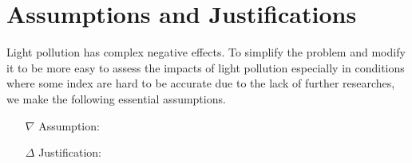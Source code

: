 \section{\textbf{Assumptions and Justifications}}
Light pollution has complex negative effects. To simplify the problem and modify it to be more easy to assess the impacts of light pollution especially in conditions where some index are hard to be accurate due to the lack of further researches, we make the following essential assumptions.
\begin{itemize}
    \item[$\nabla$] Assumption:
    \item[$\Delta$] Justification:
\end{itemize}